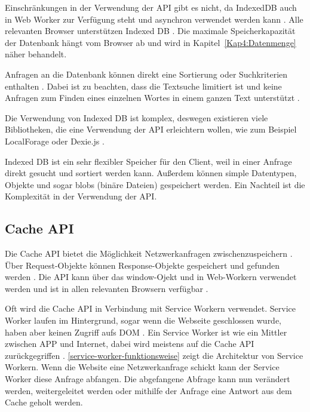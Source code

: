 Einschränkungen in der Verwendung der \ac{API} gibt es nicht, da IndexedDB auch in Web Worker zur Verfügung steht und asynchron verwendet werden kann \autocite{Hajian2019} \autocite{mdn-indexeddb}. Alle relevanten Browser unterstützen Indexed DB \autocite{mdn-indexeddb-api}. Die maximale Speicherkapazität der Datenbank hängt vom Browser ab und wird in Kapitel~\ref{Kap4:Datenmenge} näher behandelt.

Anfragen an die Datenbank können direkt eine Sortierung oder Suchkriterien enthalten \autocite{mdn-indexeddb}. Dabei ist zu beachten, dass die Textsuche limitiert ist und keine Anfragen zum Finden eines einzelnen Wortes in einem ganzen Text unterstützt \autocite{mdn-indexeddb}. 

Die Verwendung von Indexed DB ist komplex, deswegen existieren viele Bibliotheken, die eine Verwendung der \ac{API} erleichtern wollen, wie zum Beispiel LocalForage oder Dexie.js \autocite{Hajian2019} \autocite{mdn-indexeddb}.

Indexed DB ist ein sehr flexibler Speicher für den Client, weil in einer Anfrage direkt gesucht und sortiert werden kann. Außerdem können simple Datentypen, Objekte und sogar \acp{blob} (binäre Dateien) gespeichert werden. Ein Nachteil ist die Komplexität in der Verwendung der \ac{API}.

\subsection{Cache API}
Die Cache \ac{API} bietet die Möglichkeit Netzwerkanfragen zwischenzuspeichern \autocite{mdn-cache-api}. Über Request-Objekte können Response-Objekte gespeichert und gefunden werden \autocite{mdn-cache-api}. Die \ac{API} kann über das window-Ojekt und in Web-Workern verwendet werden und ist in allen relevanten Browsern verfügbar \autocite{mdn-cache-api}.

Oft wird die Cache \ac{API} in Verbindung mit Service Workern verwendet. Service Worker laufen im Hintergrund, sogar wenn die Webseite geschlossen wurde, haben aber keinen Zugriff aufs DOM \autocite{Sheppard2017}. Ein Service Worker ist wie ein Mittler zwischen APP und Internet, dabei wird meistens auf die Cache API zurückgegriffen \autocite{Sheppard2017}. \autoref{service-worker-funktionsweise} zeigt die Architektur von Service Workern. Wenn die Website eine Netzwerkanfrage schickt kann der Service Worker diese Anfrage abfangen. Die abgefangene Abfrage kann nun verändert werden, weitergeleitet werden oder mithilfe der Anfrage eine Antwort aus dem Cache geholt werden.

